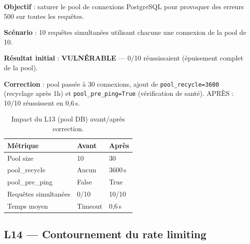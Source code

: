 \documentclass[12pt,a4paper,oneside]{report}
\begin{document}
\textbf{Objectif} : saturer le pool de connexions PostgreSQL pour provoquer des erreurs 500 sur toutes les requ\^{e}tes.



\textbf{Sc\'{e}nario} : 10 requ\^{e}tes simultan\'{e}es utilisant chacune une connexion de la pool de 10.



\textbf{R\'{e}sultat initial} : \textcolor{danger}{\textbf{VULN\'{E}RABLE}} --- 0/10 r\'{e}ussissaient (\'{e}puisement complet de la pool).



\textbf{Correction} : pool pass\'{e}e \`{a} 30 connexions, ajout de \texttt{pool\_recycle=3600} (recyclage apr\`{e}s 1h) et \texttt{pool\_pre\_ping=True} (v\'{e}rification de sant\'{e}). APR\`{E}S : 10/10 r\'{e}ussissent en 0,6\,s.



\begin{table}[htbp]\centering

\begin{tabular}{@{}lll@{}}

\toprule

\textbf{M\'{e}trique} & \textbf{Avant} & \textbf{Apr\`{e}s} \\

\midrule

Pool size & 10 & 30 \\

pool\_recycle & Aucun & 3600\,s \\

pool\_pre\_ping & False & True \\

Requ\^{e}tes simultan\'{e}es & 0/10 & 10/10 \\

Temps moyen & Timeout & 0,6\,s \\

\bottomrule

\end{tabular}

\caption{Impact du L13 (pool DB) avant/apr\`{e}s correction.}\label{tab:l13}

\end{table}



\subsection{L14 --- Contournement du rate limiting}
\end{document}
